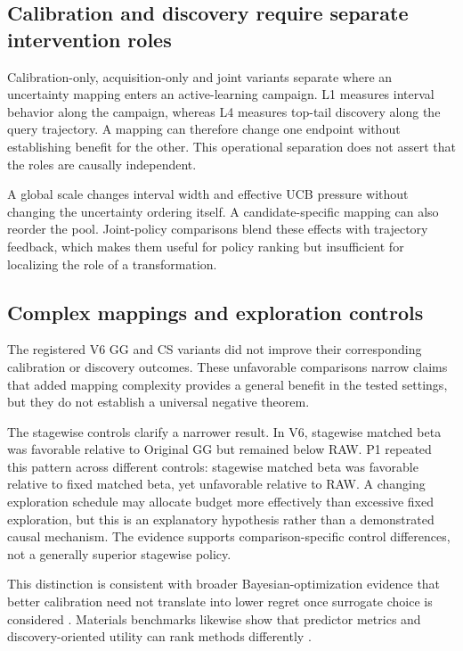 \documentclass[10pt,twocolumn]{article}
\begin{document}
\subsection{Calibration and discovery require separate intervention roles}
Calibration-only, acquisition-only and joint variants separate where an uncertainty mapping enters an active-learning campaign. L1 measures interval behavior along the campaign, whereas L4 measures top-tail discovery along the query trajectory. A mapping can therefore change one endpoint without establishing benefit for the other. This operational separation does not assert that the roles are causally independent.

A global scale changes interval width and effective UCB pressure without changing the uncertainty ordering itself. A candidate-specific mapping can also reorder the pool. Joint-policy comparisons blend these effects with trajectory feedback, which makes them useful for policy ranking but insufficient for localizing the role of a transformation.

\subsection{Complex mappings and exploration controls}
The registered V6 GG and CS variants did not improve their corresponding calibration or discovery outcomes. These unfavorable comparisons narrow claims that added mapping complexity provides a general benefit in the tested settings, but they do not establish a universal negative theorem.

The stagewise controls clarify a narrower result. In V6, stagewise matched beta was favorable relative to Original GG but remained below RAW. P1 repeated this pattern across different controls: stagewise matched beta was favorable relative to fixed matched beta, yet unfavorable relative to RAW. A changing exploration schedule may allocate budget more effectively than excessive fixed exploration, but this is an explanatory hypothesis rather than a demonstrated causal mechanism. The evidence supports comparison-specific control differences, not a generally superior stagewise policy.

This distinction is consistent with broader Bayesian-optimization evidence that better calibration need not translate into lower regret once surrogate choice is considered \citep{foldager2023uncertainty}. Materials benchmarks likewise show that predictor metrics and discovery-oriented utility can rank methods differently \citep{wang2022benchmark,riebesell2025matbenchdiscovery}.
\end{document}
